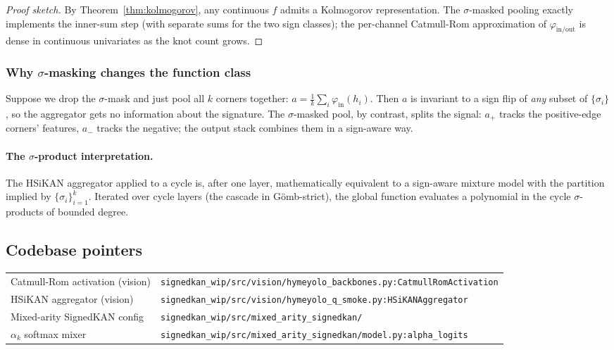 \documentclass[11pt,a4paper]{article}
\theoremstyle{remark}
\newcommand{\GS}{G\"omb}
\begin{document}
\begin{proof}[Proof sketch]
By Theorem~\ref{thm:kolmogorov}, any continuous $f$ admits a
Kolmogorov representation. The $\sigma$-masked pooling exactly
implements the inner-sum step (with separate sums for the two
sign classes); the per-channel Catmull-Rom approximation of
$\varphi_{\text{in/out}}$ is dense in continuous univariates as
the knot count grows.
\end{proof}

\subsubsection{Why $\sigma$-masking changes the function class}

Suppose we drop the $\sigma$-mask and just pool all $k$ corners
together: $a = \frac{1}{k} \sum_i \varphi_{\text{in}}(h_i)$. Then
$a$ is invariant to a sign flip of \emph{any} subset of
$\{\sigma_i\}$, so the aggregator gets no information about the
signature. The $\sigma$-masked pool, by contrast, splits the
signal: $a_+$ tracks the positive-edge corners' features,
$a_-$ tracks the negative; the output stack combines them in a
sign-aware way.

\paragraph{The $\sigma$-product interpretation.} The HSiKAN aggregator
applied to a cycle is, after one layer, mathematically equivalent
to a sign-aware mixture model with the partition implied by
$\{\sigma_i\}_{i=1}^k$. Iterated over cycle layers (the cascade
in \GS{}-strict), the global function evaluates a polynomial in
the cycle $\sigma$-products of bounded degree.

\subsection{Codebase pointers}

\begin{tabular}{ll}
Catmull-Rom activation (vision) & \texttt{signedkan\_wip/src/vision/hymeyolo\_backbones.py:CatmullRomActivation} \\
HSiKAN aggregator (vision) & \texttt{signedkan\_wip/src/vision/hymeyolo\_q\_smoke.py:HSiKANAggregator} \\
Mixed-arity SignedKAN config & \texttt{signedkan\_wip/src/mixed\_arity\_signedkan/} \\
$\alpha_k$ softmax mixer & \texttt{signedkan\_wip/src/mixed\_arity\_signedkan/model.py:alpha\_logits} \\
\end{tabular}
\end{document}

